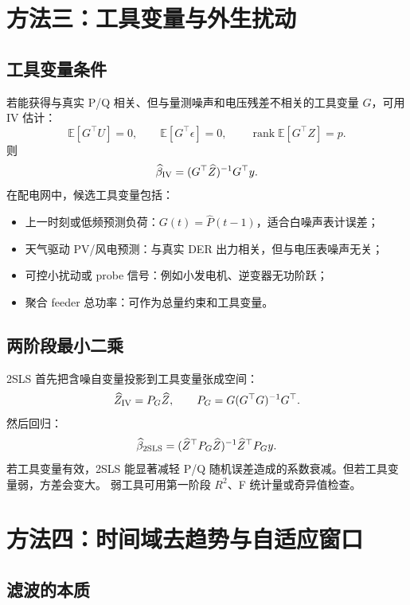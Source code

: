 \documentclass[UTF8,11pt]{ctexart}
\newcommand{\E}{\mathbb{E}}
\begin{document}
\section{方法三：工具变量与外生扰动}

\subsection{工具变量条件}

若能获得与真实 P/Q 相关、但与量测噪声和电压残差不相关的工具变量 $G$，可用 IV 估计：
\[
    \E[G^\top U]=0,\qquad \E[G^\top\epsilon]=0,\qquad \operatorname{rank}\E[G^\top Z]=p.
\]
则
\begin{equation}
    \widehat\beta_{\rm IV}
    =
    (G^\top \widehat Z)^{-1}G^\top y.
    \label{eq:iv}
\end{equation}
在配电网中，候选工具变量包括：

\begin{itemize}[leftmargin=2em]
  \item 上一时刻或低频预测负荷：$G(t)=\widehat P(t-1)$，适合白噪声表计误差；
  \item 天气驱动 PV/风电预测：与真实 DER 出力相关，但与电压表噪声无关；
  \item 可控小扰动或 probe 信号：例如小发电机、逆变器无功阶跃；
  \item 聚合 feeder 总功率：可作为总量约束和工具变量。
\end{itemize}

\subsection{两阶段最小二乘}

2SLS 首先把含噪自变量投影到工具变量张成空间：
\[
    \widehat Z_{\rm IV}=P_G\widehat Z,\qquad
    P_G=G(G^\top G)^{-1}G^\top.
\]
然后回归：
\begin{equation}
    \widehat\beta_{\rm 2SLS}
    =
    (\widehat Z^\top P_G\widehat Z)^{-1}
    \widehat Z^\top P_G y.
    \label{eq:2sls}
\end{equation}
若工具变量有效，2SLS 能显著减轻 P/Q 随机误差造成的系数衰减。但若工具变量弱，方差会变大。
弱工具可用第一阶段 $R^2$、F 统计量或奇异值检查。

\section{方法四：时间域去趋势与自适应窗口}

\subsection{滤波的本质}
\end{document}

